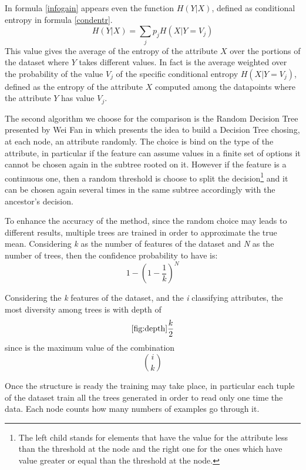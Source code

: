 \documentclass{acm_proc_article-sp-sigmod07}
\begin{document}
In formula \ref{infogain} appears even the function $H(Y|X)$, defined as
conditional entropy in formula \ref{condentr}.
\begin{equation}
H(Y|X) = \sum_{j} p_j H(X| Y  = V_j)
\label{condentr}
\end{equation}
This value gives the average of the entropy of the attribute $X$ over the
portions of the dataset where $Y$ takes different values.
In fact is the average weighted over the probability of the value $V_j$ of
the specific conditional entropy $H(X| Y  = V_j)$, defined as the entropy
of the attribute $X$ computed among the datapoints where the attribute $Y$
has value $V_j$. 

The second algorithm we choose for the comparison is the Random Decision
Tree presented by Wei Fan in \cite{fan:rdt} which presents the idea to
build a Decision Tree chosing, at each node, an attribute randomly. The
choice is bind on the type of the attribute, in particular if the feature
can assume values in a finite set of options it cannot be chosen again in
the subtree rooted on it. However if the feature is a continuous one, then
a random threshold is choose to split the decision\footnote{The left child
stands for elements that have the value for the attribute less than the
threshold at the node and the right one for the ones which have value
greater or equal than the threshold at the node.} and it can be chosen
again several times in the same subtree accordingly with the ancestor's
decision.

To enhance the accuracy of the method, since the random choice may
leads to different results, multiple trees are trained in order to
approximate the true mean. Considering \emph{k} as the number of features
of the dataset and \emph{N} as the number of trees, then the confidence
probability to have is:
\begin{equation}
\label{formula:confidence}
1 - ( 1 - \frac{1}{k})^N
\end{equation}

Considering the \emph{k} features of the dataset, and the \emph{i}
classifying attributes, the most diversity among trees is with depth of 
\begin{equation}
\ref{fig:depth}
\frac{k}{2} 
\end{equation}
since is the maximum value of the combination
\begin{equation}
 {{i}\choose{k}}
\end{equation}

Once the structure is ready the training may take place, in
particular each tuple of the dataset train all the trees generated in
order to read only one time the data. Each node counts how many
numbers of examples go through it.
\end{document}
